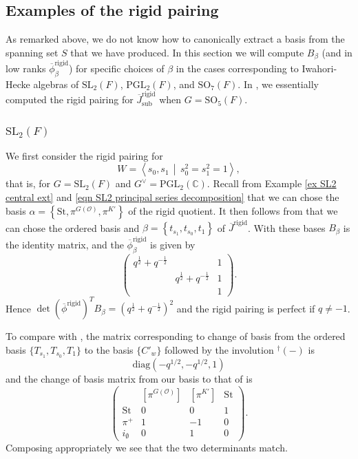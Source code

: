 \documentclass[10pt]{article}
\newcommand{\diag}{\mathrm{diag}}
\newcommand{\genrel}[2]{\left\langle #1\,\middle|\,#2\right\rangle}
\newcommand{\sett}[1]{\left\{#1\right\}}
\newcommand{\C}{\mathbb{C}}
\newcommand{\Oo}{\mathcal{O}}
\newcommand{\PGL}{\mathrm{PGL}}
\newcommand{\SL}{\mathrm{SL}}
\newcommand{\SO}{\mathrm{SO}}
\newcommand{\St}{\mathrm{St}}
\theoremstyle{definition}
\theoremstyle{remark}
\newcommand{\Gd}{G^\vee}
\newcommand{\phir}{\overline{\phi}^{\mathrm{rigid}}}
\newcommand{\Jr}{\overline{J}^{\mathrm{rigid}}}
\newcommand{\Jrs}{\overline{J}^{\mathrm{rigid}}_{\mathrm{sub}}}
\begin{document}
\subsection{Examples of the rigid pairing}
\label{section Examples}
%
As remarked above, we do not know how to canonically extract a basis from the spanning set $S$ that we have produced.
In this section we will compute $B_\beta$ (and in low ranks $\phir_\beta$) for specific choices 
of $\beta$ in the cases corresponding to Iwahori-Hecke algebras of $\SL_2(F)$, $\PGL_2(F)$, and $\SO_7(F)$.
In \cite[Example 11]{Plancherel}, we essentially computed the rigid pairing for $\Jrs$
when $G=\SO_5(F)$.
%
\subsubsection{$\SL_2(F)$}
\label{subsection example SL2}
We first consider the rigid pairing for 
%
\[
W=\genrel{s_0,s_1}{s_0^2=s_1^2=1},
\]
%
that is, for $G=\SL_2(F)$ and $\Gd=\PGL_2(\C)$. Recall from Example \ref{ex SL2 central ext}
and \eqref{eqn SL2 principal series decomposition} that we can chose the basis
$\alpha=\sett{\St, \pi^{G(\Oo)},\pi^{K'}}$ of the rigid quotient. 
It then follows from \cite{DSL2}  that
we can chose the ordered basis
and $\beta=\sett{t_{s_1}, t_{s_0}, t_{1}}$ 
of $\Jr$. With these bases $B_\beta$ is the identity matrix, and the $\phir_\beta$ is given by
%
\[
\begin{pmatrix}
q^{\frac{1}{2}}+q^{-\frac{1}{2}} &&1\\
&q^{\frac{1}{2}}+q^{-\frac{1}{2}}&1\\
&&1
\end{pmatrix}.
\]
%
Hence $\det(\phir)^TB_\beta=(q^{\frac{1}{2}}+q^{-\frac{1}{2}})^2$ and the rigid pairing is perfect if 
$q\neq -1$. 

To compare with \cite{CH}, the matrix corresponding
to change of basis from the ordered basis $\{T_{s_1}, T_{s_0}, T_1\}$ to the basis $\{C'_w\}$ 
followed by the involution ${}^\dagger(-)$ is 
%
\[
\diag(-q^{1/2},-q^{1/2},1)
\]
%
and the change of basis matrix from our basis to that of \cite{CH} is 
%
\[
\begin{pmatrix}
&[\pi^{G(\Oo)}]&[\pi^{K'}]&\St\\
\St &0&0&1\\
\pi^+ &1&-1&0\\
i_\emptyset &0&1&0
\end{pmatrix}.
\]
%
Composing appropriately we see that the two determinants match.
%
\end{document}
